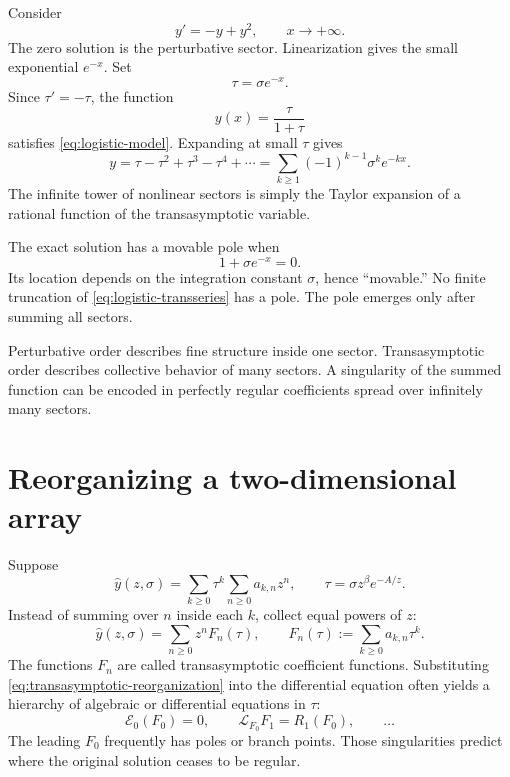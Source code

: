 \documentclass[11pt,openany]{book}
\theoremstyle{definition}
\theoremstyle{plain}
\theoremstyle{remark}
\newcommand{\trans}[1]{\widehat{#1}}
\begin{document}
Consider
\begin{equation}\label{eq:logistic-model}
 y'=-y+y^2,
 \qquad x\longrightarrow+\infty.
\end{equation}
The zero solution is the perturbative sector. Linearization gives the small exponential $e^{-x}$. Set
\[
 \tau=\sigma e^{-x}.
\]
Since $\tau'=-\tau$, the function
\begin{equation}\label{eq:logistic-exact}
 y(x)=\frac{\tau}{1+\tau}
\end{equation}
satisfies \eqref{eq:logistic-model}. Expanding at small $\tau$ gives
\begin{equation}\label{eq:logistic-transseries}
 y=\tau-\tau^2+\tau^3-\tau^4+\cdots
 =\sum_{k\ge1}(-1)^{k-1}\sigma^ke^{-kx}.
\end{equation}
The infinite tower of nonlinear sectors is simply the Taylor expansion of a rational function of the transasymptotic variable.

The exact solution has a movable pole when
\begin{equation}\label{eq:logistic-pole}
 1+\sigma e^{-x}=0.
\end{equation}
Its location depends on the integration constant $\sigma$, hence ``movable.'' No finite truncation of \eqref{eq:logistic-transseries} has a pole. The pole emerges only after summing all sectors.

\begin{intuitionbox}
Perturbative order describes fine structure inside one sector. Transasymptotic order describes collective behavior of many sectors. A singularity of the summed function can be encoded in perfectly regular coefficients spread over infinitely many sectors.
\end{intuitionbox}

\section{Reorganizing a two-dimensional array}

Suppose
\begin{equation}\label{eq:double-transseries}
 \trans y(z,\sigma)
 =\sum_{k\ge0}\tau^k
 \sum_{n\ge0}a_{k,n}z^n,
 \qquad \tau=\sigma z^\beta e^{-A/z}.
\end{equation}
Instead of summing over $n$ inside each $k$, collect equal powers of $z$:
\begin{equation}\label{eq:transasymptotic-reorganization}
 \trans y(z,\sigma)
 =\sum_{n\ge0}z^nF_n(\tau),
 \qquad
 F_n(\tau):=\sum_{k\ge0}a_{k,n}\tau^k.
\end{equation}
The functions $F_n$ are called transasymptotic coefficient functions. Substituting \eqref{eq:transasymptotic-reorganization} into the differential equation often yields a hierarchy of algebraic or differential equations in $\tau$:
\[
 \mathcal E_0(F_0)=0,
 \qquad
 \mathcal L_{F_0}F_1=R_1(F_0),
 \qquad\dots
\]
The leading $F_0$ frequently has poles or branch points. Those singularities predict where the original solution ceases to be regular.
\end{document}
